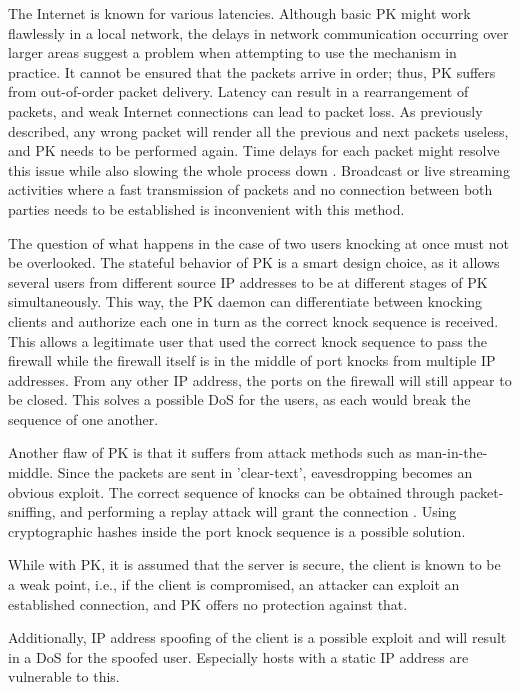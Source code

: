 The Internet is known for various latencies.  Although basic PK might work flawlessly in a local network, the delays in network communication occurring over larger areas suggest a problem when attempting to use the mechanism in practice.
It cannot be ensured that the packets arrive in order; thus, PK suffers from out-of-order packet delivery.  Latency can result in a rearrangement of packets, and weak Internet connections can lead to packet loss. As previously described, any wrong packet will render all the previous and next packets useless, and PK needs to be performed again.  Time delays for each packet might resolve this issue while also slowing the whole process down \cite{PKissues}.  Broadcast or live streaming activities where a fast transmission of packets and no connection between both parties needs to be established is inconvenient with this method.\par
The question of what happens in the case of two users knocking at once must not be overlooked.  The stateful behavior of PK is a smart design choice, as it allows several users from different source IP addresses to be at different stages of PK simultaneously.  This way, the PK daemon can differentiate between knocking clients and authorize each one in turn as the correct knock sequence is received.  This allows a legitimate user that used the correct knock sequence to pass the firewall while the firewall itself is in the middle of port knocks from multiple IP addresses.  From any other IP address, the ports on the firewall will still appear to be closed.  This solves a possible DoS for the users, as each would break the sequence of one another.\\\par

Another flaw of PK is that it suffers from attack methods such as man-in-the-middle.  Since the packets are sent in 'clear-text', eavesdropping becomes an obvious exploit.  The correct sequence of knocks can be obtained through packet-sniffing, and performing a replay attack will grant the connection \cite{sushant}. Using cryptographic hashes inside the port knock sequence is a possible solution.  \par
While with PK, it is assumed that the server is secure, the client is known to be a weak point, i.e., if the client is compromised, an attacker can exploit an established connection, and PK offers no protection against that.

Additionally, IP address spoofing of the client is a possible exploit and will result in a DoS for the spoofed user.  Especially hosts with a static IP address are vulnerable to this.\par

